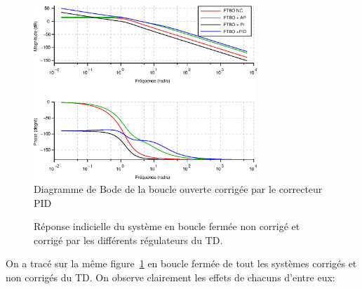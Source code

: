 \begin{figure}[!h]
    \centering
    \includegraphics[width=0.75\textwidth]{fig/chap_correction/bode_BOC_all.eps}
    \caption{Diagramme de Bode de la boucle ouverte corrigée par 
    le correcteur PID}
\end{figure}
\clearpage
\begin{figure}
\centering
{}

\caption{Réponse indicielle du système en boucle fermée non corrigé 
         et corrigé par les différents régulateurs 
         du TD.~\label{fig-reponses_indicielles}}
\end{figure}
On a tracé sur la même figure~\ref{fig-reponses_indicielles} en boucle fermée 
de tout les systèmes corrigés et non corrigés du TD. On observe clairement les
effets de chacuns d'entre eux:
